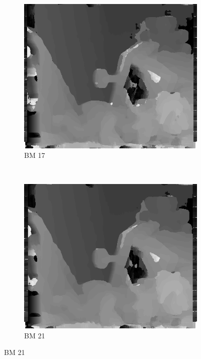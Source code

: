 \begin{figure}
\begin{subfigure}[b]{0.23\textwidth}
    \centering
    \includegraphics[width=\textwidth]{images/stereo-pairs/teddy_bm_17.png}
    \caption{BM 17}
  \end{subfigure}
  ~
  \begin{subfigure}[b]{0.23\textwidth}
    \centering
    \includegraphics[width=\textwidth]{images/stereo-pairs/teddy_bm_21.png}
    \caption{BM 21}
  \end{subfigure}


\end{figure}
